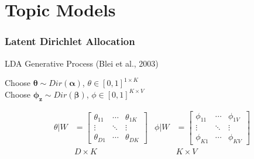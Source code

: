 \documentclass{beamer}
\begin{document}
    \section{Topic Models}

    \begin{frame}
        \frametitle{Latent Dirichlet Allocation}
        LDA Generative Process (Blei et al., 2003)
        \newline

        \begin{algorithm}[H]

            Choose $\mathbf{\theta} \sim Dir(\mathbf{\alpha})$, $\theta \in [0, 1]^{1 \times K}$ \\
            Choose $\mathbf{\phi_{z}} \sim Dir(\mathbf{\beta})$, $\phi \in [0, 1]^{K \times V}$ \\
        \end{algorithm}

        \begin{equation*}
            \begin{array}{ccccc}
                \theta | W &=
                \begin{bmatrix}
                    \theta_{11} & \cdots & \theta_{1K} \\
                    \vdots &\ddots & \vdots \\
                    \theta_{D1} & \cdots & \theta_{DK}
                \end{bmatrix} &

                \phi | W &=
                \begin{bmatrix}
                    \phi_{11} & \cdots & \phi_{1V} \\
                    \vdots &\ddots & \vdots \\
                    \phi_{K1} & \cdots & \phi_{KV}
                \end{bmatrix} \\
                & \text{$D \times K$} & & \text{$K \times V$}
            \end{array}
        \end{equation*}
    \end{frame}
\end{document}
